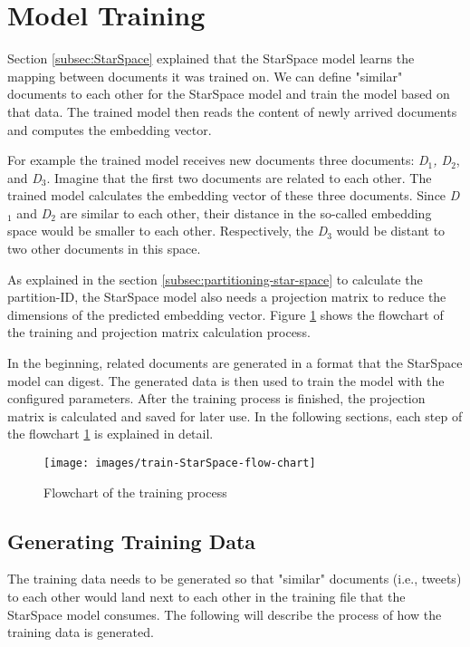 \section{Model Training}
\label{sec:model-training}
Section \ref{subsec:StarSpace} explained that the StarSpace model learns the mapping between documents it was trained on. We can define "similar" documents to each other for the StarSpace model and train the model based on that data. The trained model then reads the content of newly arrived documents and computes the embedding vector. 


For example the trained model receives new documents three documents: \emph{D$_1$, D$_2$}, and \emph{D$_3$}. Imagine that the first two documents are related to each other. The trained model calculates the embedding vector of these three documents. Since \emph{D$_1$} and \emph{D$_2$} are similar to each other, their distance in the so-called embedding space would be smaller to each other. Respectively, the \emph{D$_3$} would be distant to two other documents in this space.


As explained in the section \ref{subsec:partitioning-star-space} to calculate the partition-ID, the StarSpace model also needs a projection matrix to reduce the dimensions of the predicted embedding vector. Figure \ref{fig:star-space-training} shows the flowchart of the training and projection matrix calculation process.


In the beginning, related documents are generated in a format that the StarSpace model can digest. The generated data is then used to train the model with the configured parameters. After the training process is finished, the projection matrix is calculated and saved for later use. In the following sections, each step of the flowchart \ref{fig:star-space-training} is explained in detail.

\begin{figure}[!htb]
    \centering
    \texttt{[image: images/train-StarSpace-flow-chart]}
    \caption{Flowchart of the training process}
    \label{fig:star-space-training}
\end{figure}

\subsection{Generating Training Data}
\label{subsec:generating-training-data}
The training data needs to be generated so that "similar" documents (i.e., tweets) to each other would land next to each other in the training file that the StarSpace model consumes. The following will describe the process of how the training data is generated.

